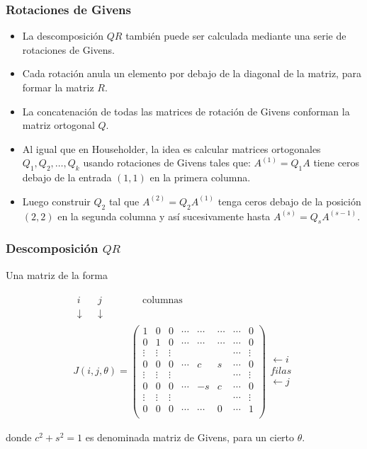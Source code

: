 \documentclass{beamer}
\begin{document}
\begin{frame}
  \frametitle{Rotaciones de Givens}
  \begin{itemize}
    \item La descomposici\'on $QR$ tambi\'en puede ser calculada mediante una serie de rotaciones de Givens.
    \item<2-> Cada rotaci\'on anula un elemento por debajo de la diagonal de la matriz, para formar la matriz $R$.
    \item<3-> La concatenaci\'on de todas las matrices de rotaci\'on de Givens conforman la matriz ortogonal $Q$.
    \item<4-> Al igual que en Householder, la idea es calcular matrices ortogonales $Q_1,Q_2,\ldots,Q_k$ usando rotaciones de Givens tales que: $A^{(1)}=Q_1A$ tiene ceros debajo de la entrada $(1,1)$ en la primera columna.
    \item<5-> Luego construir $Q_2$ tal que $A^{(2)}=Q_2A^{(1)}$ tenga ceros debajo de la posici\'on $(2,2)$ en la segunda columna y as\'i sucesivamente hasta $A^{(s)}=Q_sA^{(s-1)}$.
  \end{itemize}
\end{frame}
\begin{frame}
  \frametitle{Descomposici\'on $QR$}
  Una matriz de la forma

  \begin{eqnarray}
  \nonumber\begin{array}{cccccccc}
    i &  &  j &         &        &        &       & \mbox{columnas}\\
   \downarrow&   &  \downarrow &         &       &        &       &
  \end{array}\\
  \nonumber J(i,j,\theta) =\left(\begin{array}{cccccccc}
  1 & 0 & 0 & \cdots & \cdots & \cdots & \cdots & 0\\
  0 & 1 & 0 & \cdots & \cdots & \cdots & \cdots & 0\\
  \vdots & \vdots & \vdots &  &  &  & \cdots & \vdots\\
  0 & 0 & 0 & \cdots & c & s & \cdots & 0\\
  \vdots & \vdots & \vdots &  &  &  & \cdots & \vdots\\
  0 & 0 & 0 & \cdots & -s & c & \cdots & 0\\
  \vdots & \vdots & \vdots &  &  &  & \cdots & \vdots\\
  0 & 0 & 0 & \cdots & \cdots & 0 & \cdots & 1\\
  \end{array}\right)\begin{array}{c}
  \\
  \\
  \\
  \leftarrow i\\
  filas \\ 
  \leftarrow j\\
  \\
  \\
  \end{array}
  \end{eqnarray}
  
  donde $c^2+s^2=1$ es denominada matriz de Givens, para un cierto $\theta$.
\end{frame} 
\end{document}
